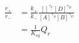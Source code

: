 \begin{eqnarray}
\frac{r_+}{r_-} & = \frac{k_+}{k_-}\frac{[]^{\gamma_C}[D]^{\gamma_D}}{[A]^{\gamma_A}[B]^{\gamma_D}} \\
&  =  \frac{1}{K_{eq}}Q_r \\
\end{eqnarray}